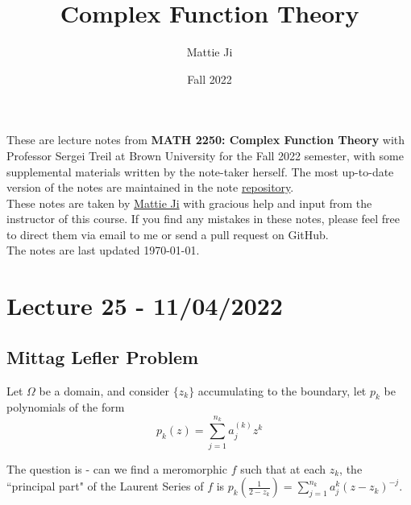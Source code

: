 \documentclass{article}
\title{Complex Function Theory}
\author{Mattie Ji}
\date{Fall 2022}
\begin{document}
\maketitle
These are lecture notes from \textbf{MATH 2250: Complex Function Theory} with Professor Sergei Treil at Brown University for the Fall 2022 semester, with some supplemental materials written by the note-taker herself. The most up-to-date version of the notes are maintained in the note \href{https://github.com/maroon-scorch/MATH2550-notes}{repository}.\\

These notes are taken by \href{https://github.com/maroon-scorch}{Mattie Ji} with gracious help and input from the instructor of this course. If you find any mistakes in these notes, please feel free to direct them via email to me or send a pull request on GitHub.\\

The notes are last updated \today.
\tableofcontents
\newpage



























\section{Lecture 25 - 11/04/2022}

\subsection{Mittag Lefler Problem}

Let $\Omega$ be a domain, and consider $\{z_k\}$ accumulating to the boundary, let $p_k$ be polynomials of the form
\[p_k(z) = \sum_{j = 1}^{n_k} a_j^{(k)} z^k\]

The question is - can we find a meromorphic $f$ such that at each $z_k$, the ``principal part" of the Laurent Series of $f$ is $p_k(\frac{1}{2 - z_k}) = \sum_{j = 1}^{n_k} a^k_j (z - z_k)^{-j}$.\\
\end{document}
